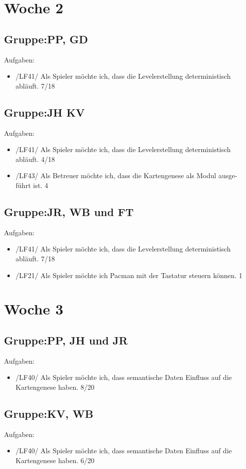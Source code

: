 \documentclass[11pt,a4paper]{article}
\begin{document}
\section*{Woche 2}

\subsection*{Gruppe:PP, GD}
Aufgaben:
\begin{itemize}
\item /LF41/ Als Spieler möchte ich, dass die Levelerstellung deterministisch abläuft. 7/18
\end{itemize} 
\subsection*{Gruppe:JH KV}
Aufgaben:
\begin{itemize}
\item /LF41/ Als Spieler möchte ich, dass die Levelerstellung deterministisch abläuft. 4/18
\item /LF43/ Als Betreuer möchte ich, dass die Kartengenese als Modul ausge-
führt ist. 4
\end{itemize}
\subsection*{Gruppe:JR, WB und FT}
Aufgaben:
\begin{itemize}
\item /LF41/ Als Spieler möchte ich, dass die Levelerstellung deterministisch abläuft. 7/18
\item /LF21/ Als Spieler möchte ich Pacman mit der Tastatur steuern können. 1
\end{itemize} 


\section*{Woche 3}
\subsection*{Gruppe:PP, JH und JR}
Aufgaben:
\begin{itemize}
\item /LF40/ Als Spieler möchte ich, dass semantische Daten Einfluss auf die
Kartengenese haben. 8/20 
\end{itemize}

\subsection*{Gruppe:KV, WB}
Aufgaben:
\begin{itemize}
\item /LF40/ Als Spieler möchte ich, dass semantische Daten Einfluss auf die
Kartengenese haben. 6/20

\end{itemize}
\end{document}
